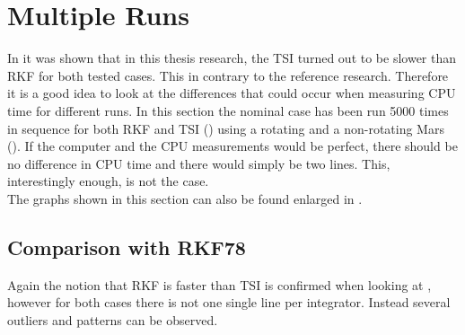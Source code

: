 \section{Multiple Runs}
\label{sec:multipleRuns}
In  it was shown that in this thesis research, the \ac{TSI} turned out to be slower than \ac{RKF} for both tested cases. This in contrary to the reference research. Therefore it is a good idea to look at the differences that could occur when measuring CPU time for different runs. In this section the nominal case has been run 5000 times in sequence for both \ac{RKF} and \ac{TSI} () using a rotating and a non-rotating Mars (). If the computer and the CPU measurements would be perfect, there should be no difference in CPU time and there would simply be two lines. This, interestingly enough, is not the case.\\

\noindent
The graphs shown in this section can also be found enlarged in .

\subsection{Comparison with \ac{RKF78}}
\label{subsec:timeCompRKF}
Again the notion that \ac{RKF} is faster than \ac{TSI} is confirmed when looking at , however for both cases there is not one single line per integrator. Instead several outliers and patterns can be observed. 

%
%
%

